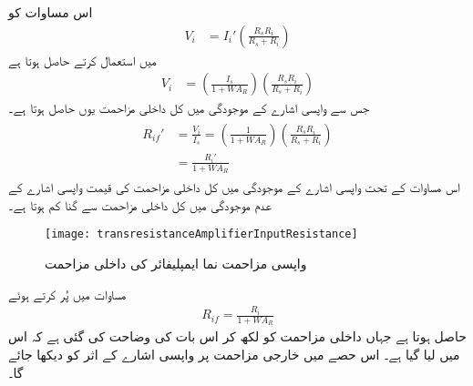 اس مساوات کو
\begin{align*}
V_i &=I_i' \left(\frac{R_s R_i}{R_s +R_i} \right )
\end{align*}
میں استعمال کرتے حاصل ہوتا ہے
\begin{align*}
V_i &= \left (\frac{I_s}{1+W A_R} \right ) \left(\frac{R_s R_i}{R_s +R_i} \right ) 
\end{align*}
جس سے واپسی اشارے کے موجودگی میں کل داخلی مزاحمت  یوں حاصل ہوتا ہے۔
\begin{gather}
\begin{aligned}\label{مساوات_واپسی_مزاحمت_نما_کی_داخلی_مزاحمت}
R_{if}'&=\frac{V_i}{I_s} = \left (\frac{1}{1+W A_R} \right ) \left(\frac{R_s R_i}{R_s +R_i} \right ) \\
&=\frac{R_i'}{1+W A_R}
\end{aligned}
\end{gather}
اس مساوات کے تحت واپسی اشارے کے موجودگی میں کل داخلی مزاحمت  کی قیمت واپسی اشارے کے عدم موجودگی میں کل داخلی مزاحمت  سے  گنا کم ہوتا ہے۔
\begin{figure}
\centering
\texttt{[image: transresistanceAmplifierInputResistance]}
\caption{واپسی مزاحمت نما ایمپلیفائر کی داخلی مزاحمت}
\label{شکل_واپسی_مزاحمت_نما_ایمپلیفائر_داخلی_مزاحمت}
\end{figure}

مساوات  میں  پُر کرتے ہوئے
\begin{align}
R_{if}=\frac{R_i}{1+W A_R}
\end{align}
حاصل ہوتا ہے جہاں داخلی مزاحمت کو  لکھ کر اس بات کی وضاحت کی گئی ہے کہ اس میں  لیا گیا ہے۔
اس حصے میں خارجی مزاحمت پر واپسی اشارے کے اثر کو دیکھا جائے گا۔

